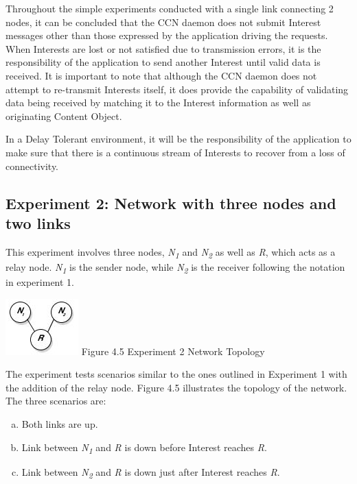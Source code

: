 \documentclass[a4paper,12pt]{report}      %
\begin{document}
Throughout the simple experiments conducted with a single link connecting 2 nodes, it can be
concluded that the CCN daemon does not submit Interest messages other than those expressed by the
application driving the requests. When Interests are lost or not satisfied due to transmission errors, it is
the responsibility of the application to send another Interest until valid data is received. It is
important to note that although the CCN daemon does not attempt to re-transmit Interests itself, it does
provide the capability of validating data being received by matching it to the Interest information as
well as originating Content Object.

In a Delay Tolerant environment, it will be the responsibility of the application to make sure that there
is a continuous stream of Interests to recover from a loss of connectivity.

\subsection{Experiment 2: Network with three nodes and two links}

This experiment involves three nodes, \emph{N\textsubscript{1}} and \emph{N\textsubscript{2}} as well as \emph{R}, which acts as a relay node. \emph{N\textsubscript{1}} is the sender node, while \emph{N\textsubscript{2}} is the receiver following the notation in experiment 1.

\begin{center}
\includegraphics[scale=0.75]{exp2topo.jpg}\newline
Figure 4.5 Experiment 2 Network Topology 
\end{center}

\noindent The experiment tests scenarios similar to the ones outlined in Experiment 1 with the addition of the relay node. Figure 4.5 illustrates the topology of the network. The three scenarios are:
\begin{enumerate}[(a)]
\item Both links are up.
\item Link between \emph{N\textsubscript{1}} and \emph{R} is down before Interest reaches \emph{R}.
\item Link between \emph{N\textsubscript{2}} and \emph{R} is down just after Interest reaches \emph{R}.
\end{enumerate}
\end{document}
